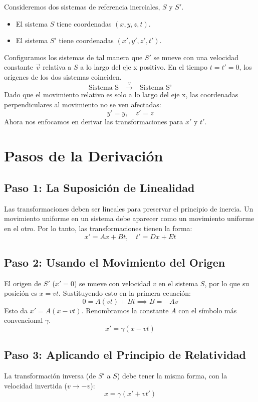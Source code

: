 \documentclass[11pt,a4paper]{article}
\begin{document}
Consideremos dos sistemas de referencia inerciales, $S$ y $S'$.
\begin{itemize}
    \item El sistema $S$ tiene coordenadas $(x, y, z, t)$.
    \item El sistema $S'$ tiene coordenadas $(x', y', z', t')$.
\end{itemize}
Configuramos los sistemas de tal manera que $S'$ se mueve con una velocidad constante $\vec{v}$ relativa a $S$ a lo largo del eje x positivo. En el tiempo $t=t'=0$, los orígenes de los dos sistemas coinciden.
\[
\text{Sistema S} \quad \xrightarrow{v} \quad \text{Sistema S'}
\]
Dado que el movimiento relativo es solo a lo largo del eje x, las coordenadas perpendiculares al movimiento no se ven afectadas:
\[ y' = y, \quad z' = z \]
Ahora nos enfocamos en derivar las transformaciones para $x'$ y $t'$.

\section{Pasos de la Derivación}

\subsection{Paso 1: La Suposición de Linealidad}

Las transformaciones deben ser lineales para preservar el principio de inercia. Un movimiento uniforme en un sistema debe aparecer como un movimiento uniforme en el otro. Por lo tanto, las transformaciones tienen la forma:
\[ x' = Ax + Bt, \quad t' = Dx + Et \]

\subsection{Paso 2: Usando el Movimiento del Origen}

El origen de $S'$ ($x'=0$) se mueve con velocidad $v$ en el sistema $S$, por lo que su posición es $x=vt$. Sustituyendo esto en la primera ecuación:
\[ 0 = A(vt) + Bt \implies B = -Av \]
Esto da $x' = A(x-vt)$. Renombramos la constante $A$ con el símbolo más convencional $\gamma$.
\[ x' = \gamma (x - vt) \]

\subsection{Paso 3: Aplicando el Principio de Relatividad}

La transformación inversa (de $S'$ a $S$) debe tener la misma forma, con la velocidad invertida ($v \to -v$):
\[ x = \gamma (x' + vt') \]
\end{document}
